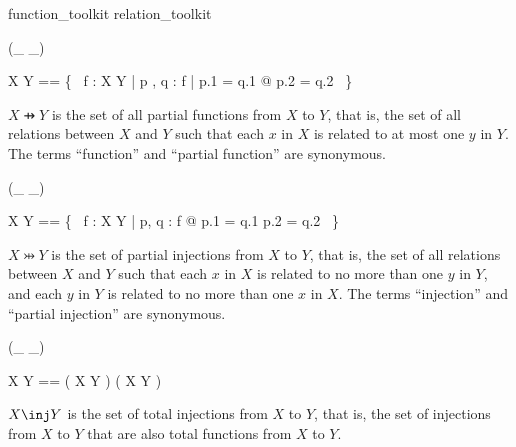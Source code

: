 \documentclass[draft,a4paper,10pt,wd]{isov2}
\begin{document}

\begin{zsection}
\SECTION function\_toolkit \parents relation\_toolkit
\end{zsection}


\begin{zed}
 \rightassoc (\_ \pfun \_)
\end{zed}

\begin{zed}
X \pfun Y == \{~ f : X \rel Y | \forall p , q : f | p.1 = q.1 @ p.2 = q.2 ~\}
\end{zed}

$X \pfun Y$ is the set of all partial functions from $X$ to $Y$,
that is, the set of all relations between $X$ and $Y$ such that
each $x$ in $X$ is related to at most one $y$ in $Y$.
The terms ``function'' and ``partial function'' are synonymous.


\begin{zed}
 \rightassoc (\_ \pinj \_)
\end{zed}

\begin{zed}
X \pinj Y == \{~ f : X \rel Y | \forall p, q : f @ p.1 = q.1 \iff p.2 = q.2 ~\}
\end{zed}

$X \pinj Y$ is the set of partial injections from $X$ to $Y$,
that is, the set of all relations between $X$ and $Y$ such that
each $x$ in $X$ is related to no more than one $y$ in $Y$,
and each $y$ in $Y$ is related to no more than one $x$ in $X$.
The terms ``injection'' and ``partial injection'' are synonymous.


\begin{zed}
 \rightassoc (\_ \inj \_)
\end{zed}

\begin{zed}
X \inj Y == ( X \pinj Y ) \cap ( X \fun Y )
\end{zed}

$X \inj Y$ is the set of total injections from $X$ to $Y$,
that is, the set of injections from $X$ to $Y$
that are also total functions from $X$ to $Y$.

\end{document}
